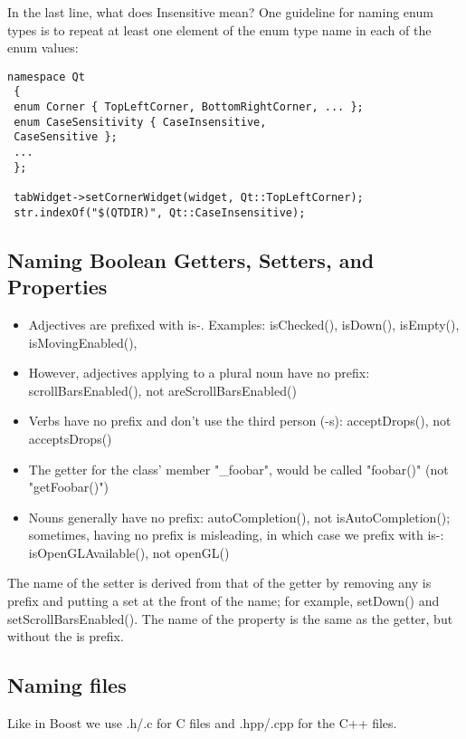 \documentclass[a4paper,12pt]{article}
\begin{document}
In the last line, what does Insensitive mean? One guideline for naming enum types is to repeat at least one element of the enum type name in each of the enum values:
\begin{lstlisting}[breaklines]
 namespace Qt
 {
 enum Corner { TopLeftCorner, BottomRightCorner, ... };
 enum CaseSensitivity { CaseInsensitive,
 CaseSensitive };
 ...
 };
 
 tabWidget->setCornerWidget(widget, Qt::TopLeftCorner);
 str.indexOf("$(QTDIR)", Qt::CaseInsensitive);
 \end{lstlisting}

\subsection{Naming Boolean Getters, Setters, and Properties}
\begin{itemize}
\item Adjectives are prefixed with is-. Examples: isChecked(), isDown(), isEmpty(), isMovingEnabled(), 
\item However, adjectives applying to a plural noun have no prefix: scrollBarsEnabled(), not areScrollBarsEnabled()
\item Verbs have no prefix and don't use the third person (-s): acceptDrops(), not acceptsDrops()
\item The getter for the class' member "\_foobar", would be called "foobar()" (not "getFoobar()")
\item Nouns generally have no prefix:  autoCompletion(), not isAutoCompletion(); sometimes, having no prefix is misleading, in which case we prefix with is-:
isOpenGLAvailable(), not openGL()
\end{itemize}

The name of the setter is derived from that of the getter by removing any is prefix and putting a set at the front of the name; for example, setDown() and setScrollBarsEnabled(). The name of the property is the same as the getter, but without the is prefix.

\subsection{Naming files}
Like in Boost we use .h/.c for C files and .hpp/.cpp for the C++ files.

\clearpage
\newpage
\end{document}
